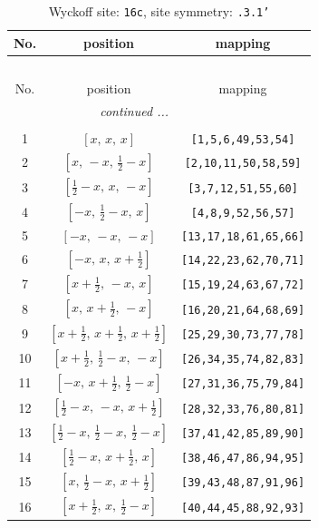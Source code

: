 \documentclass[fleqn,8pt]{jsarticle}
\begin{document}
\begin{longtable}{ccc}
\caption{Wyckoff site: {\tt 16c}, site symmetry: {\tt .3.1'}}
 \\
 \hline \hline
No. & position & mapping \\ \hline \endfirsthead

\multicolumn{2}{l}{\tablename\ \thetable{}} \\
 \hline \hline
No. & position & mapping \\ \hline \endhead

 \hline \hline
\multicolumn{2}{r}{\footnotesize\it continued ...} \\ \endfoot

 \hline \hline
\multicolumn{2}{r}{} \\ \endlastfoot

1 & $\left[ x,\, x,\, x \right]$ & {\tt [1,5,6,49,53,54]} \\ \hline
2 & $\left[ x,\, - x,\, \frac{1}{2} - x \right]$ & {\tt [2,10,11,50,58,59]} \\ \hline
3 & $\left[ \frac{1}{2} - x,\, x,\, - x \right]$ & {\tt [3,7,12,51,55,60]} \\ \hline
4 & $\left[ - x,\, \frac{1}{2} - x,\, x \right]$ & {\tt [4,8,9,52,56,57]} \\ \hline
5 & $\left[ - x,\, - x,\, - x \right]$ & {\tt [13,17,18,61,65,66]} \\ \hline
6 & $\left[ - x,\, x,\, x + \frac{1}{2} \right]$ & {\tt [14,22,23,62,70,71]} \\ \hline
7 & $\left[ x + \frac{1}{2},\, - x,\, x \right]$ & {\tt [15,19,24,63,67,72]} \\ \hline
8 & $\left[ x,\, x + \frac{1}{2},\, - x \right]$ & {\tt [16,20,21,64,68,69]} \\ \hline
9 & $\left[ x + \frac{1}{2},\, x + \frac{1}{2},\, x + \frac{1}{2} \right]$ & {\tt [25,29,30,73,77,78]} \\ \hline
10 & $\left[ x + \frac{1}{2},\, \frac{1}{2} - x,\, - x \right]$ & {\tt [26,34,35,74,82,83]} \\ \hline
11 & $\left[ - x,\, x + \frac{1}{2},\, \frac{1}{2} - x \right]$ & {\tt [27,31,36,75,79,84]} \\ \hline
12 & $\left[ \frac{1}{2} - x,\, - x,\, x + \frac{1}{2} \right]$ & {\tt [28,32,33,76,80,81]} \\ \hline
13 & $\left[ \frac{1}{2} - x,\, \frac{1}{2} - x,\, \frac{1}{2} - x \right]$ & {\tt [37,41,42,85,89,90]} \\ \hline
14 & $\left[ \frac{1}{2} - x,\, x + \frac{1}{2},\, x \right]$ & {\tt [38,46,47,86,94,95]} \\ \hline
15 & $\left[ x,\, \frac{1}{2} - x,\, x + \frac{1}{2} \right]$ & {\tt [39,43,48,87,91,96]} \\ \hline
16 & $\left[ x + \frac{1}{2},\, x,\, \frac{1}{2} - x \right]$ & {\tt [40,44,45,88,92,93]} \\
\end{longtable}
\end{document}
